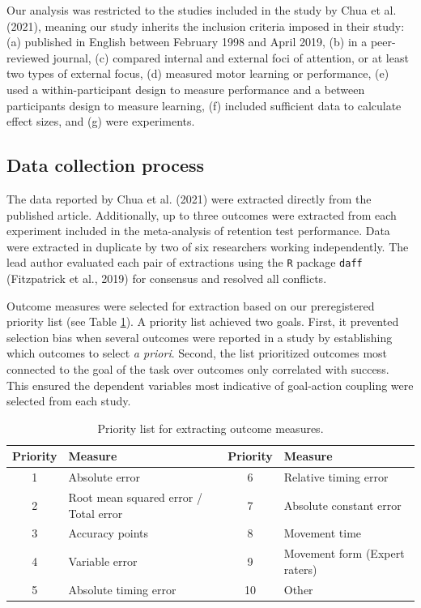 \documentclass[
  man, donotrepeattitle,floatsintext]{apa7}
\begin{document}
Our analysis was restricted to the studies included in the study by Chua et al. (2021), meaning our study inherits the inclusion criteria imposed in their study: (a) published in English between February 1998 and April 2019, (b) in a peer-reviewed journal, (c) compared internal and external foci of attention, or at least two types of external focus, (d) measured motor learning or performance, (e) used a within-participant design to measure performance and a between participants design to measure learning, (f) included sufficient data to calculate effect sizes, and (g) were experiments.

\hypertarget{data-collection-process}{%
\subsection{Data collection process}\label{data-collection-process}}

The data reported by Chua et al. (2021) were extracted directly from the published article. Additionally, up to three outcomes were extracted from each experiment included in the meta-analysis of retention test performance. Data were extracted in duplicate by two of six researchers working independently. The lead author evaluated each pair of extractions using the \texttt{R} package \texttt{daff} (Fitzpatrick et al., 2019) for consensus and resolved all conflicts.

Outcome measures were selected for extraction based on our preregistered priority list (see Table \ref{tab:table1}). A priority list achieved two goals. First, it prevented selection bias when several outcomes were reported in a study by establishing which outcomes to select \emph{a priori}. Second, the list prioritized outcomes most connected to the goal of the task over outcomes only correlated with success. This ensured the dependent variables most indicative of goal-action coupling were selected from each study.

\begin{table}

\caption{\label{tab:table1}Priority list for extracting outcome measures.}
\fontsize{10}{12}\selectfont
\begin{tabular}[t]{clcl}
\toprule
Priority & Measure & Priority & Measure\\
\midrule
1 & Absolute error & 6 & Relative timing error\\
2 & Root mean squared error / Total error & 7 & Absolute constant error\\
3 & Accuracy points & 8 & Movement time\\
4 & Variable error & 9 & Movement form (Expert raters)\\
5 & Absolute timing error & 10 & Other\\
\bottomrule
\end{tabular}
\end{table}
\end{document}
